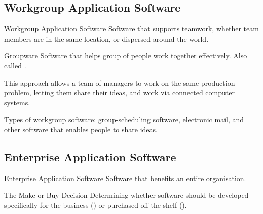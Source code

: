 \documentclass[\main/notes.tex]{subfiles}
\begin{document}
			\subsection{Workgroup Application Software}
				\begin{definition}{Workgroup Application Software}
					Software that supports teamwork, whether team members are in the same location, or dispersed around the world.
				\end{definition}
				\begin{definition}{Groupware}
					Software that helps group of people work together effectively. Also called .

					This approach allows a team of managers to work on the same production problem, letting them share their ideas, and work via connected computer systems.
				\end{definition}
				\begin{example}
					Types of workgroup software: group-scheduling software, electronic mail, and other software that enables people to share ideas.
				\end{example}
			\subsection{Enterprise Application Software}
				\begin{definition}{Enterprise Application Software}
					Software that benefits an entire organisation.
				\end{definition}
				\begin{definition}{The Make-or-Buy Decision}
					Determining whether software should be developed specifically for the business () or purchased off the shelf ().
				\end{definition}
	\vbox{}
\end{document}
